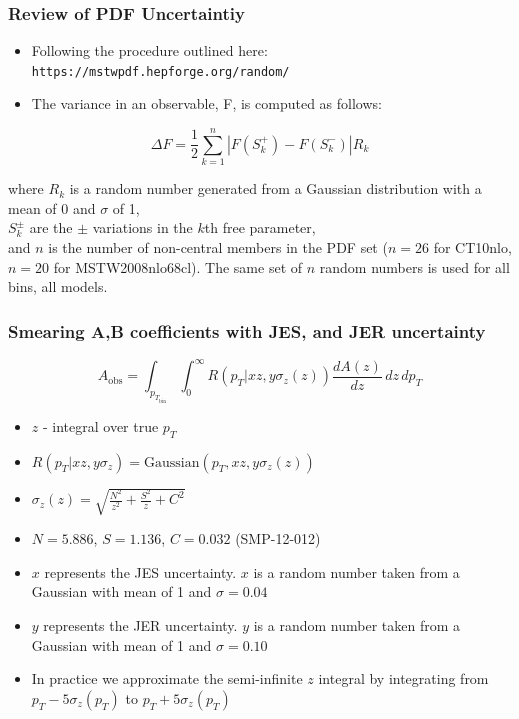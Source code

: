 \documentclass{beamer}
\begin{document}
\begin{frame}
	\frametitle{Review of PDF Uncertaintiy}
	\begin{itemize}
		\item Following the procedure outlined here: \texttt{https://mstwpdf.hepforge.org/random/}
		\item The variance in an observable, F, is computed as follows:
	\end{itemize}
	\[ \Delta F = \frac{1}{2}\sum_{k=1}^{n} \left| F(S_{k}^{+}) -F(S_{k}^{-}) \right| R_{k}\]
	
	\small
		where $R_{k}$ is a random number generated from a Gaussian distribution with a mean of 0 and $\sigma$ of 1,\\
		\vspace{0.2in}
		$S^{\pm}_{k}$ are the ${\pm}$ variations in the $k$th free parameter, \\
		\vspace{0.2in}
		and $n$ is the number of non-central members in the PDF set ($n=26$ for CT10nlo, $n=20$ for MSTW2008nlo68cl). {\color{blue} The same set of $n$ random numbers is used for all bins, all models.} 
	\normalsize	 	
\end{frame}


\begin{frame}
	\frametitle{Smearing A,B coefficients with JES, and JER uncertainty}
	
	\[ A_{\mbox{obs}} = \int_{p_T_{\mbox{bin}}} \int_{0}^{\infty} R\left( p_T | xz,y\sigma_z(z) \right)\frac{d A\left(z \right)}{dz} \, dz \,dp_T \]
	
	\begin{itemize}
		\item $z$ - integral over true $p_{T}$
		\item $ R\left( p_T | xz,y\sigma_z \right) = \mbox{Gaussian}\left(p_T, xz, y\sigma_z(z) \right) $
		\item $ \sigma_z(z) = \sqrt{\frac{N^2}{z^2} + \frac{S^2}{z} + C^2 } $
		\item $N=5.886$, $S=1.136$, $C=0.032$  (SMP-12-012)
		\item $x$ represents the JES uncertainty.  $x$ is a random number taken from a Gaussian with mean of 1 and $\sigma=0.04$
		\item $y$ represents the JER uncertainty.  $y$ is a random number taken from a Gaussian with mean of 1 and $\sigma=0.10$
		\item In practice we approximate the semi-infinite $z$ integral by integrating from $p_T-5\sigma_z(p_T)$ to $p_T+5\sigma_z(p_T)$
	\end{itemize}
\end{frame}
\end{document}
